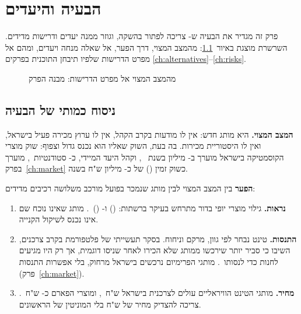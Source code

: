 \chapter{הבעיה והיעדים}
\label{ch:problem}

פרק זה מגדיר את הבעיה ש- צריכה לפתור בהשקה, וגוזר ממנה יעדים ודרישות
מדידים. השרשרת מוצגת באיור~\ref{fig:problem-chain}: מהמצב המצוי, דרך הפער, אל
שאלה מנחה ויעדים, ומהם אל מפרט הדרישות שלפיו תיבחן התוכנית בפרקים
\ref{ch:alternatives}--\ref{ch:risks}.

\begin{figure}[htbp]
  \begin{diagram}
    
  \end{diagram}
  \caption{מהמצב המצוי אל מפרט הדרישות: מבנה הפרק}
  \label{fig:problem-chain}
\end{figure}

\section{ניסוח כמותי של הבעיה}
\label{sec:problem-statement}

\textbf{המצב המצוי.}  היא מותג חדש: אין לו מודעות בקרב הקהל, אין לו
ערוץ מכירה פעיל בישראל, ואין לו היסטוריית מכירות. בה בעת, השוק שאליו הוא נכנס
גדול וצפוף: שוק מוצרי הקוסמטיקה בישראל מוערך ב- מיליון בשנת
~\cite{mordor2026israel}, וקהל היעד המיידי, כ-
סטודנטיות~\cite{che2026students,cbs2024students}, מוערך בפרק~\ref{ch:market}
כשוק זמין () של כ- מיליון ש"ח בשנה.

\textbf{הפער} בין המצב המצוי לבין מותג שנמכר בפועל מורכב משלושה רכיבים מדידים:

\begin{enumerate}
  \item \textbf{נראות.} גילוי מוצרי יופי בדור  מתרחש בעיקר ברשתות:
     () ו- ()~\cite{meintjes2025genz}.
    מותג שאינו נוכח שם אינו נכנס לשיקול הקנייה.
  \item \textbf{התנסות.} טינט נבחר לפי גוון, מרקם וניחוח. בסקר תעשייתי של
    פלטפורמת  בקרב  צרכנים,  השיבו כי סביר יותר
    שירכשו ממותג שלא הכירו לאחר שניסו דוגמית, אך רק  היו מגיעים לחנות כדי לנסותו~\cite{cosmeticsbusiness2021sampling}.
    מותגי הפרימיום נרכשים בישראל מרחוק, בלי אפשרות התנסות (פרק~\ref{ch:market}).
  \item \textbf{מחיר.} מותגי הטינט הוויראליים עולים לצרכנית בישראל 
    ש"ח~\cite{makeupstore2026rhode,caretobeauty2026benefit}, ומוצרי הפארם
    כ- ש"ח~\cite{essence2026superpharm}.  צריכה להצדיק מחיר
    של  ש"ח בלי המוניטין של הראשונים.
\end{enumerate}

